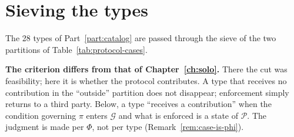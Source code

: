 \section{Sieving the types}
\label{sec:protocol-filter}

The 28 types of Part~\ref{part:catalog} are passed through the sieve of the two partitions of
Table~\ref{tab:protocol-cases}.

\textbf{The criterion differs from that of Chapter~\ref{ch:solo}.} There the cut was
feasibility; here it is whether the protocol contributes. A type that receives no
contribution in the ``outside'' partition does not disappear; enforcement simply returns to a
third party. Below, a type ``receives a contribution'' when the condition governing $\pi$
enters $\mathcal{G}$ and what is enforced is a state of $\mathcal{P}$. The judgment is made
per $\Phi$, not per type (Remark~\ref{rem:case-is-phi}).

